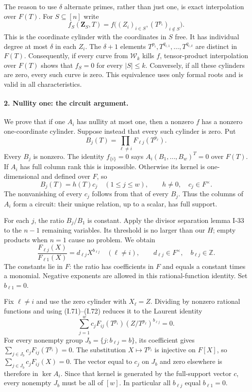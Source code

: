 The reason to use $\delta$ alternate primes, rather than just
one, is exact interpolation over $F(T)$. For $S\subseteq[n]$
write
\[
 f_S(\mathbf Z_S,T)=
 f\bigl((Z_i)_{i\in S},(T^{p_i})_{i\notin S}\bigr).
 \tag{I.70}
\]
This is the coordinate cylinder with the coordinates in $S$
free. It has individual degree at most $\delta$ in each $Z_i$.
The $\delta+1$ elements
$T^{p_i},T^{q_{i,1}},\ldots,T^{q_{i,\delta}}$ are distinct
in $F(T)$. Consequently, if every curve from $\mathcal W_k$
kills $f$, tensor-product interpolation over $F(T)$ shows that
$f_S=0$ for every $|S|\le k$. Conversely, if all these cylinders
are zero, every such curve is zero. This equivalence uses only
formal roots and is valid in all characteristics.

\paragraph{2. Nullity one: the circuit argument.}
We prove that if one $A_i$ has nullity at most one, then a
nonzero $f$ has a nonzero one-coordinate cylinder. Suppose
instead that every such cylinder is zero. Put
\[
 B_j(T)=\prod_{\ell\ne i}F_{\ell j}(T^{p_\ell}).
\]
Every $B_j$ is nonzero. The identity $f_{\{i\}}=0$ says
$A_i(B_1,\ldots,B_w)^T=0$ over $F(T)$.
If $A_i$ has full column rank this is impossible. Otherwise
its kernel is one-dimensional and defined over $F$, so
\[
 B_j(T)=h(T)c_j\quad(1\le j\le w),
 \qquad h\ne0,\quad c_j\in F^\times.
 \tag{I.71}
\]
The nonvanishing of every $c_j$ follows from that of every
$B_j$. Thus the columns of $A_i$ form a circuit: their unique
relation, up to a scalar, has full support.

For each $j$, the ratio $B_j/B_1$ is constant. Apply the
divisor separation lemma I-33 to the $n-1$ remaining variables.
Its threshold is no larger than our $H$; empty products when
$n=1$ cause no problem. We obtain
\[
 \frac{F_{\ell j}(X)}{F_{\ell1}(X)}
       =d_{\ell j}X^{b_{\ell j}}
 \quad(\ell\ne i),
 \qquad d_{\ell j}\in F^\times,
 \quad b_{\ell j}\in\mathbb Z.
 \tag{I.72}
\]
The constants lie in $F$: the ratio has coefficients in $F$
and equals a constant times a monomial. Negative exponents
are allowed in this rational-function identity. Set
$b_{\ell1}=0$.

Fix $\ell\ne i$ and use the zero cylinder with $X_\ell=Z$.
Dividing by nonzero rational functions and using (I.71)--(I.72)
reduces it to the Laurent identity
\[
 \sum_{j=1}^w c_j F_{ij}(T^{p_i})
       (Z/T^{p_\ell})^{b_{\ell j}}=0.
 \tag{I.73}
\]
For every nonempty group $J_b=\{j:b_{\ell j}=b\}$, its
coefficient gives
$\sum_{j\in J_b}c_jF_{ij}(T^{p_i})=0$.
The substitution $X\mapsto T^{p_i}$ is injective on $F[X]$,
so $\sum_{j\in J_b}c_jF_{ij}(X)=0$.
The vector equal to $c_j$ on $J_b$ and zero elsewhere is
therefore in $\ker A_i$. Since that kernel is generated by
the full-support vector $c$, every nonempty $J_b$ must be
all of $[w]$. In particular all $b_{\ell j}$ equal
$b_{\ell1}=0$.

